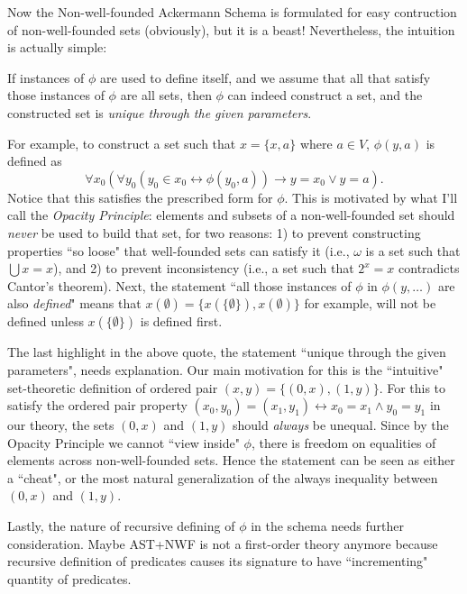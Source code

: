 \documentclass{article}
\begin{document}
Now the Non-well-founded Ackermann Schema is formulated for easy contruction of non-well-founded sets (obviously), but it is a beast! Nevertheless, the intuition is actually simple:

\begin{displayquote}
If instances of $\phi$ are used to define itself, and we assume that all that satisfy those instances of $\phi$ are all sets, then $\phi$ can indeed construct a set, and the constructed set is \textit{unique through the given parameters}.
\end{displayquote}

For example, to construct a set such that $x=\{x, a\}$ where $a \in V$, $\phi(y, a)$ is defined as $$\forall x_0 (\forall y_0 (y_0 \in x_0 \leftrightarrow \phi(y_0, a)) \rightarrow y = x_0 \vee y = a).$$ Notice that this satisfies the prescribed form for $\phi$. This is motivated by what I'll call the \textit{Opacity Principle}: elements and subsets of a non-well-founded set should \textit{never} be used to build that set, for two reasons: 1) to prevent constructing properties ``so loose" that well-founded sets can satisfy it (i.e., $\omega$ is a set such that $\bigcup x = x$), and 2) to prevent inconsistency (i.e., a set such that $2^x = x$ contradicts Cantor's theorem). Next, the statement ``all those instances of $\phi$ in $\phi(y, \ldots)$ are also \textit{defined}" means that $x(\emptyset) = \{x(\{\emptyset\}), x(\emptyset)\}$ for example, will not be defined unless $x(\{\emptyset\})$ is defined first.

The last highlight in the above quote, the statement ``unique through the given parameters", needs explanation. Our main motivation for this is the ``intuitive" set-theoretic definition of ordered pair $(x,y) = \{(0,x), (1, y)\}$. For this to satisfy the ordered pair property $(x_0,y_0) = (x_1, y_1) \leftrightarrow x_0 = x_1 \wedge y_0 = y_1$ in our theory, the sets $(0,x)$ and $(1,y)$ should \textit{always} be unequal. Since by the Opacity Principle we cannot ``view inside" $\phi$, there is freedom on equalities of elements across non-well-founded sets. Hence the statement can be seen as either a ``cheat", or the most natural generalization of the always inequality between $(0,x)$ and $(1,y)$.

Lastly, the nature of recursive defining of $\phi$ in the schema needs further consideration. Maybe \textsf{AST+NWF} is not a first-order theory anymore because recursive definition of predicates causes its signature to have ``incrementing" quantity of predicates.
\end{document}
